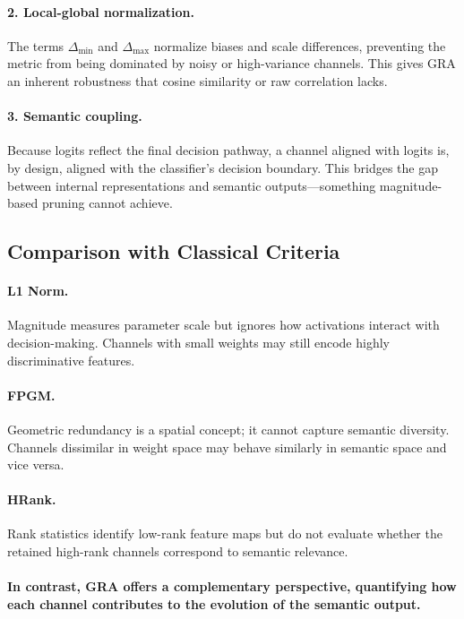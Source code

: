 \documentclass[sn-mathphys,Numbered]{sn-jnl}
\begin{document}
\paragraph{2. Local-global normalization.}  
The terms $\Delta_{\min}$ and $\Delta_{\max}$ normalize biases and scale differences, preventing the metric from being dominated by noisy or high-variance channels. This gives GRA an inherent robustness that cosine similarity or raw correlation lacks.

\paragraph{3. Semantic coupling.}  
Because logits reflect the final decision pathway, a channel aligned with logits is, by design, aligned with the classifier’s decision boundary. This bridges the gap between internal representations and semantic outputs—something magnitude-based pruning cannot achieve.

\subsection{Comparison with Classical Criteria}

\paragraph{L1 Norm.}  
Magnitude measures parameter scale but ignores how activations interact with decision-making. Channels with small weights may still encode highly discriminative features.

\paragraph{FPGM.}  
Geometric redundancy is a spatial concept; it cannot capture semantic diversity. Channels dissimilar in weight space may behave similarly in semantic space and vice versa.

\paragraph{HRank.}  
Rank statistics identify low-rank feature maps but do not evaluate whether the retained high-rank channels correspond to semantic relevance.

\paragraph{In contrast, GRA offers a complementary perspective, quantifying how each channel contributes to the evolution of the semantic output.}
\end{document}
